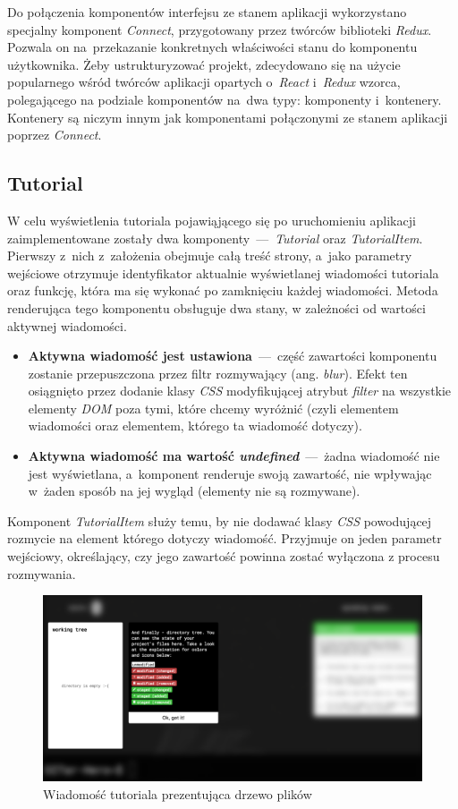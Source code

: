 \documentclass[12pt,a4paper,polish,thesis]{dcsbook}
\begin{document}
{	Do połączenia komponentów interfejsu ze stanem aplikacji wykorzystano specjalny komponent \textit{Connect}, przygotowany przez twórców biblioteki \textit{Redux}. Pozwala on na~przekazanie konkretnych właściwości stanu do komponentu użytkownika. Żeby ustrukturyzować projekt, zdecydowano się na użycie popularnego wśród twórców aplikacji opartych o~\textit{React} i~\textit{Redux} wzorca, polegającego na podziale komponentów na~dwa typy: komponenty i~kontenery. Kontenery są niczym innym jak komponentami połączonymi ze stanem aplikacji poprzez \textit{Connect}.

	\subsection{Tutorial}

	W celu wyświetlenia tutoriala pojawiąjącego się po uruchomieniu aplikacji zaimplementowane zostały dwa komponenty~---~\textit{Tutorial} oraz \textit{TutorialItem}. Pierwszy z~nich z~założenia obejmuje całą treść strony, a~jako parametry wejściowe otrzymuje identyfikator aktualnie wyświetlanej wiadomości tutoriala oraz funkcję, która ma się wykonać po zamknięciu każdej wiadomości. Metoda renderująca tego komponentu obsługuje dwa stany, w zależności od wartości aktywnej wiadomości. 
	\begin{itemize}
		\item \textbf{Aktywna wiadomość jest ustawiona}~---~część zawartości komponentu zostanie przepuszczona przez filtr rozmywający (ang. \textit{blur}). Efekt ten osiągnięto przez dodanie klasy \textit{CSS} modyfikującej atrybut \textit{filter} na wszystkie elementy \textit{DOM} poza tymi, które chcemy wyróżnić (czyli elementem wiadomości oraz elementem, którego ta wiadomość dotyczy).
		\item \textbf{Aktywna wiadomość ma wartość \textit{undefined}}~---~żadna wiadomość nie jest wyświetlana, a~komponent renderuje swoją zawartość, nie wpływając w~żaden sposób na jej wygląd (elementy nie są rozmywane).
	\end{itemize}
	Komponent \textit{TutorialItem} służy temu, by nie dodawać klasy \textit{CSS} powodującej rozmycie na element którego dotyczy wiadomość. Przyjmuje on jeden parametr wejściowy, określający, czy jego zawartość powinna zostać wyłączona z procesu rozmywania.

	\begin{figure}[h]
		\centering
		\includegraphics[width=15cm]{component-tutorial}
		\caption{Wiadomość tutoriala prezentująca drzewo plików}
		\label{fig:tutorial}
	\end{figure}
	\FloatBarrier

}
\end{document}
